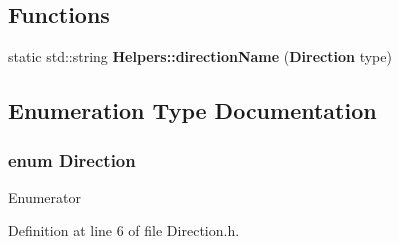 \subsection*{Functions}
\begin{DoxyCompactItemize}
\item 
static std\+::string {\bf Helpers\+::direction\+Name} ({\bf Direction} type)
\end{DoxyCompactItemize}


\subsection{Enumeration Type Documentation}
\subsubsection[{Direction}]{\setlength{\rightskip}{0pt plus 5cm}enum {\bf Direction}\hspace{0.3cm}{\ttfamily [strong]}}\label{_direction_8h_a224b9163917ac32fc95a60d8c1eec3aa}
\begin{Desc}
\item[Enumerator]\par
\begin{description}
\item[{\em 
Up\label{_direction_8h_a224b9163917ac32fc95a60d8c1eec3aaa258f49887ef8d14ac268c92b02503aaa}
}]\item[{\em 
Down\label{_direction_8h_a224b9163917ac32fc95a60d8c1eec3aaa08a38277b0309070706f6652eeae9a53}
}]\end{description}
\end{Desc}


Definition at line 6 of file Direction.\+h.

